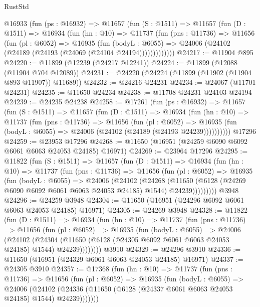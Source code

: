 \begin{lexlean}{RustStd}
\begin{coremodule}
    @16933
      (fun (ps : @16932) =>
      @11657
        (fun (S : @1511) =>
        @11657
          (fun (D : @1511) =>
          @16934
            (fun (hn : @10) =>
            @11737
              (fun (pns : @11736) =>
              @11656
                (fun (pl : @6052) =>
                @16935
                  (fun (bodyL : @6055) =>
                  @24006 (@24102 (@24189 (@24193 (@24069 (@24104 @24194)))))))))))))
@24217 := @11904 @895
@24220 := @11899 (@12239 (@24217 @12241))
@24224 := @11899 (@12088 (@11904 @704 @12089))
@24231 := @24220 (@24224 (@11899 (@11902 (@11904 @893 @11907)) @11689))
@24232 := @24216 @24231
@24234 := @24067 (@11701 @24231)
@24235 := @11650 @24234
@24238 := @11708 @24231 @24103 @24194
@24239 := @24235 @24238
@24258 := @17261
    (fun (ps : @16932) =>
    @11657
      (fun (S : @1511) =>
      @11657
        (fun (D : @1511) =>
        @16934
          (fun (hn : @10) =>
          @11737
            (fun (pns : @11736) =>
            @11656
              (fun (pl : @6052) =>
              @16935 (fun (bodyL : @6055) => @24006 (@24102 (@24189 (@24193 @24239))))))))))
    @17296
@24259 := @23953 @17296
@24268 := @11650 (@16951 (@24259 @6090 @6092 @6061 @6063 @24053 @24185) @16971)
@24269 := @23964 @17296
@24295 := @11822
    (fun (S : @1511) =>
    @11657
      (fun (D : @1511) =>
      @16934
        (fun (hn : @10) =>
        @11737
          (fun (pns : @11736) =>
          @11656
            (fun (pl : @6052) =>
            @16935
              (fun (bodyL : @6055) =>
              @24006
                (@24102
                  (@24268
                    (@11650
                      (@6128 (@24269 @6090 @6092 @6061 @6063 @24053 @24185) @1544)
                      @24239)))))))))
    @3948
@24296 := @24259 @3948
@24304 := @11650 (@16951 (@24296 @6092 @6061 @6063 @24053 @24185) @16971)
@24305 := @24269 @3948
@24328 := @11822
    (fun (D : @1511) =>
    @16934
      (fun (hn : @10) =>
      @11737
        (fun (pns : @11736) =>
        @11656
          (fun (pl : @6052) =>
          @16935
            (fun (bodyL : @6055) =>
            @24006
              (@24102
                (@24304
                  (@11650 (@6128 (@24305 @6092 @6061 @6063 @24053 @24185) @1544) @24239))))))))
    @3910
@24329 := @24296 @3910
@24336 := @11650 (@16951 (@24329 @6061 @6063 @24053 @24185) @16971)
@24337 := @24305 @3910
@24357 := @17368
    (fun (hn : @10) =>
    @11737
      (fun (pns : @11736) =>
      @11656
        (fun (pl : @6052) =>
        @16935
          (fun (bodyL : @6055) =>
          @24006
            (@24102 (@24336 (@11650 (@6128 (@24337 @6061 @6063 @24053 @24185) @1544) @24239)))))))

\end{coremodule}
\end{lexlean}

